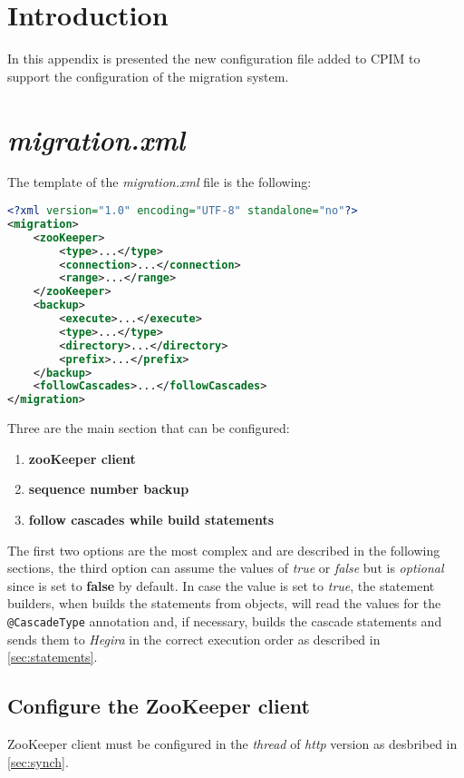 \section{Introduction}
In this appendix is presented the new configuration file added to CPIM to support the configuration of the migration system.

\section{\textit{migration.xml}}
The template of the \textit{migration.xml} file is the following:

\begin{lstlisting}[language=XML, caption=migration.xml template]
<?xml version="1.0" encoding="UTF-8" standalone="no"?>
<migration>
    <zooKeeper>
        <type>...</type>
        <connection>...</connection>
        <range>...</range>
    </zooKeeper>
    <backup>
        <execute>...</execute>
        <type>...</type>
        <directory>...</directory>
        <prefix>...</prefix>
    </backup>
    <followCascades>...</followCascades>
</migration>
\end{lstlisting}

\newparagraph Three are the main section that can be configured:
\begin{enumerate}
\item \textbf{zooKeeper client}
\item \textbf{sequence number backup}
\item \textbf{follow cascades while build statements}
\end{enumerate}

\noindent The first two options are the most complex and are described in the following sections, the third option can assume the values of \textit{true} or \textit{false} but is \textit{optional} since is set to \textbf{false} by default.
In case the value is set to \textit{true}, the statement builders, when builds the statements from objects, will read the values for the \texttt{@CascadeType} annotation and, if necessary, builds the cascade statements and sends them to \textit{Hegira} in the correct execution order as described in \ref{sec:statements}.

\subsection{Configure the ZooKeeper client}
ZooKeeper client must be configured in the \textit{thread} of \textit{http} version as desbribed in \ref{sec:synch}.

